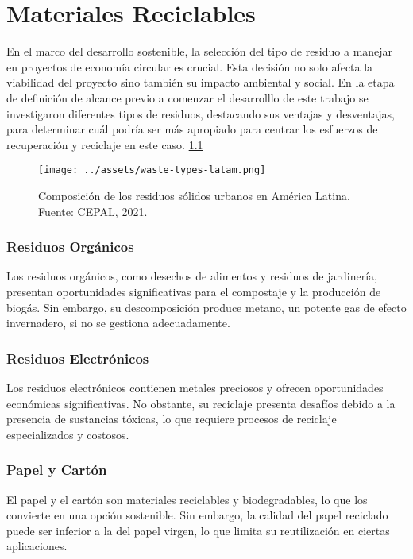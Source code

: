 \chapter{Materiales Reciclables}
\label{cp:recycling-materials}

\parindent0pt


En el marco del desarrollo sostenible, la selección del tipo de residuo a manejar en proyectos de economía circular es crucial. Esta decisión no solo afecta la viabilidad del proyecto \cite{baralla2023waste} sino también su impacto ambiental y social. En la etapa de definición de alcance previo a comenzar el desarrolllo de este trabajo se investigaron diferentes tipos de residuos, destacando sus ventajas y desventajas, para determinar cuál podría ser más apropiado para centrar los esfuerzos de recuperación y reciclaje en este caso. \ref{fig:waste-latam}

\begin{figure}[h]
	\centering
	\texttt{[image: ../assets/waste-types-latam.png]}
	\caption{Composición de los residuos sólidos urbanos en América Latina. Fuente: CEPAL, 2021.}
	\label{fig:waste-latam}
\end{figure}

\subsection{Residuos Orgánicos}
Los residuos orgánicos, como desechos de alimentos y residuos de jardinería, presentan oportunidades significativas para el compostaje y la producción de biogás. Sin embargo, su descomposición produce metano, un potente gas de efecto invernadero, si no se gestiona adecuadamente.

\subsection{Residuos Electrónicos}
Los residuos electrónicos contienen metales preciosos y ofrecen oportunidades económicas significativas. No obstante, su reciclaje presenta desafíos debido a la presencia de sustancias tóxicas, lo que requiere procesos de reciclaje especializados y costosos.

\subsection{Papel y Cartón}
El papel y el cartón son materiales reciclables y biodegradables, lo que los convierte en una opción sostenible. Sin embargo, la calidad del papel reciclado puede ser inferior a la del papel virgen, lo que limita su reutilización en ciertas aplicaciones.

